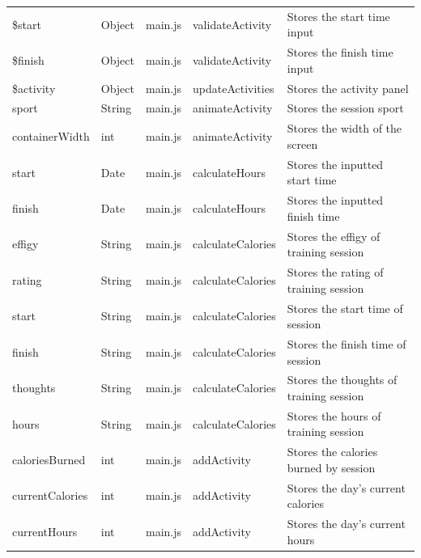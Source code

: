 \documentclass{article}[12pt,a4paper]
\begin{document}
\begin{table}[h]
\begin{tabular}{lllll}
\$start           & Object        & main.js             & validateActivity          & Stores the start time input             \\
\$finish          & Object        & main.js             & validateActivity          & Stores the finish time input            \\
\$activity        & Object        & main.js             & updateActivities          & Stores the activity panel               \\
sport             & String        & main.js             & animateActivity           & Stores the session sport                \\
containerWidth    & int           & main.js             & animateActivity           & Stores the width of the screen          \\
start             & Date          & main.js             & calculateHours            & Stores the inputted start time          \\
finish            & Date          & main.js             & calculateHours            & Stores the inputted finish time         \\
effigy            & String        & main.js             & calculateCalories         & Stores the effigy of training session   \\
rating            & String        & main.js             & calculateCalories         & Stores the rating of training session   \\
start             & String        & main.js             & calculateCalories         & Stores the start time of session        \\
finish            & String        & main.js             & calculateCalories         & Stores the finish time of session       \\
thoughts          & String        & main.js             & calculateCalories         & Stores the thoughts of training session \\
hours             & String        & main.js             & calculateCalories         & Stores the hours of training session    \\
caloriesBurned    & int           & main.js             & addActivity               & Stores the calories burned by session   \\
currentCalories   & int           & main.js             & addActivity               & Stores the day's current calories       \\
currentHours      & int           & main.js             & addActivity               & Stores the day's current hours          \\

\end{tabular}
\end{table}
\end{document}
